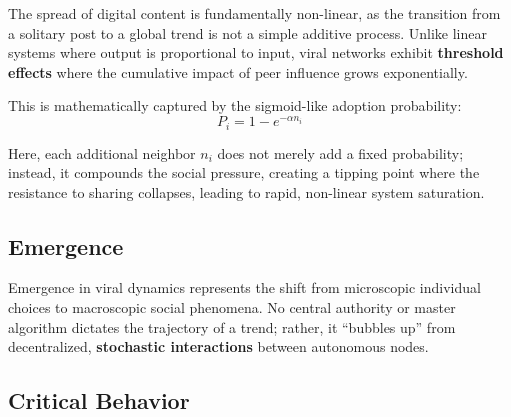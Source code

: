 \documentclass[12pt]{article}
\begin{document}
The spread of digital content is fundamentally non-linear, as the transition from a solitary post to a global trend is not a simple additive process. Unlike linear systems where output is proportional to input, viral networks exhibit \textbf{threshold effects} where the cumulative impact of peer influence grows exponentially. 

\vspace{0.4cm}

This is mathematically captured by the sigmoid-like adoption probability:
\begin{equation}
P_i = 1 - e^{-\alpha n_i}
\end{equation}
\vspace{0.4cm}

\noindent Here, each additional neighbor $n_i$ does not merely add a fixed probability; instead, it compounds the social pressure, creating a tipping point where the resistance to sharing collapses, leading to rapid, non-linear system saturation.

\vfill %

\subsection{Emergence}

Emergence in viral dynamics represents the shift from microscopic individual choices to macroscopic social phenomena. No central authority or master algorithm dictates the trajectory of a trend; rather, it ``bubbles up'' from decentralized, \textbf{stochastic interactions} between autonomous nodes. 

\vspace{0.8cm}


\vfill
\newpage

\newpage

\subsection{Critical Behavior}
\end{document}
